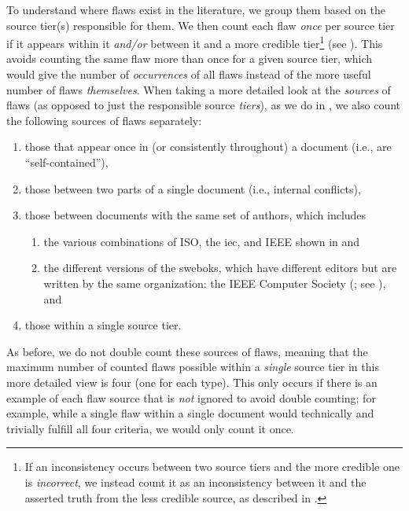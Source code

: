 \label{flaw-cred-compare}
To understand where flaws exist in the literature, we group them based on the
source tier(s) responsible for them. We then count each flaw \emph{once} per
source tier if it appears within it \emph{and/or} between it and a more
credible tier\footnote{If an inconsistency occurs between two source tiers
    and the more credible one is \emph{incorrect}, we instead count it as an
    inconsistency between it and the asserted truth from the less credible
    source, as described in .} (see ).
This avoids counting the same flaw
more than once for a given source tier, which would give the
number of \emph{occurrences} of all flaws instead of the more useful number of
flaws \emph{themselves}. When taking a more detailed look at the \emph{sources}
of flaws (as opposed to just the responsible source \emph{tiers}), as we do in
, we also count the following sources of flaws separately:
\begin{enumerate}
    \item those that appear once in (or consistently throughout) a document
          (i.e., are ``self-contained''),
    \item those between two parts of a single document
          (i.e., internal conflicts),
    \item those between documents with the same set of authors, which includes
          \begin{enumerate}
              \item the various combinations of ISO, the \acf{iec}, and IEEE
                    shown in  and
              \item the different versions of the \acfp{swebok}, which have
                    different editors \citep{SWEBOK2024,SWEBOK2014} but are
                    written by the same organization: the IEEE Computer Society
                    (\citealp{AboutSWEBOK}; see ), and
          \end{enumerate}
    \item those within a single source tier.
\end{enumerate}
As before, we do not double count these sources of flaws, meaning that the
maximum number of counted flaws possible within a \emph{single} source tier in
this more detailed view is four (one for each type). This only occurs if there
is an example of each flaw source that is \emph{not} ignored to avoid double
counting; for example, while a single flaw within a single document would
technically and trivially fulfill all four criteria, we would only count it
once.

